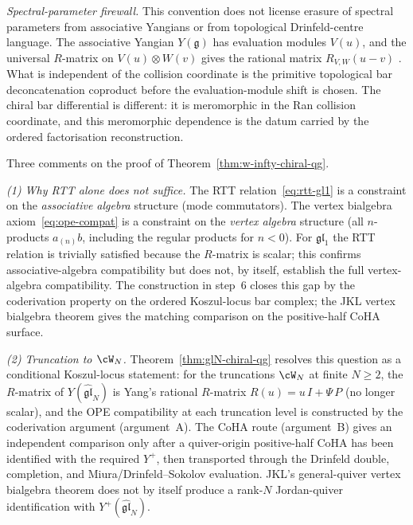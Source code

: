 \begin{remark}
\smallskip
\noindent\emph{Spectral-parameter firewall.}
This convention does not license erasure of spectral parameters
from associative Yangians or from topological Drinfeld-centre
language. The associative Yangian $Y(\mathfrak g)$ has evaluation modules
$V(u)$, and the universal $R$-matrix on
$V(u)\otimes W(v)$ gives the rational matrix $R_{V,W}(u-v)$
\cite[Ch.~12]{ChariPressley94}. What is independent of the
collision coordinate is the primitive topological bar
deconcatenation coproduct before the evaluation-module shift is
chosen. The chiral bar differential is different: it is
meromorphic in the Ran collision coordinate, and this
meromorphic dependence is the datum carried by the ordered
factorisation reconstruction.
\end{remark}

\begin{remark}
\label{rem:w-infty-vertex-gap}
Three comments on the proof of
Theorem~\textup{\ref{thm:w-infty-chiral-qg}}.

\smallskip
\noindent\emph{(1) Why RTT alone does not suffice.}
The RTT relation~\eqref{eq:rtt-gl1} is a constraint on the
\emph{associative algebra} structure (mode commutators).
The vertex bialgebra axiom~\eqref{eq:ope-compat} is a
constraint on the \emph{vertex algebra} structure (all
$n$-products $a_{(n)}b$, including the regular products for
$n < 0$). For $\mathfrak{gl}_1$ the RTT relation is
trivially satisfied because the $R$-matrix is scalar; this
confirms associative-algebra compatibility but does not, by
itself, establish the full vertex-algebra compatibility.
The construction in step~6 closes this gap by the coderivation
property on the ordered Koszul-locus bar complex; the JKL vertex
bialgebra theorem gives the matching comparison on the positive-half
CoHA surface.

\smallskip
\noindent\emph{(2) Truncation to $\cW_N$.}
Theorem~\ref{thm:glN-chiral-qg} resolves this question as a
conditional Koszul-locus statement: for the truncations
$\cW_N$ at finite $N \geq 2$, the
$R$-matrix of $Y(\widehat{\mathfrak{gl}}_N)$ is Yang's
rational $R$-matrix $R(u) = u\, I + \Psi\, P$ (no longer
scalar), and the OPE compatibility at each truncation level
is constructed by the coderivation argument
(argument~A). The CoHA route (argument~B) gives an independent
comparison only after a quiver-origin positive-half CoHA has
been identified with the required $Y^+$, then transported
through the Drinfeld double, completion, and
Miura/Drinfeld--Sokolov evaluation. JKL's general-quiver vertex
bialgebra theorem does not by itself produce a rank-$N$
Jordan-quiver identification with
$Y^+(\widehat{\mathfrak{gl}}_N)$.


\end{remark}
